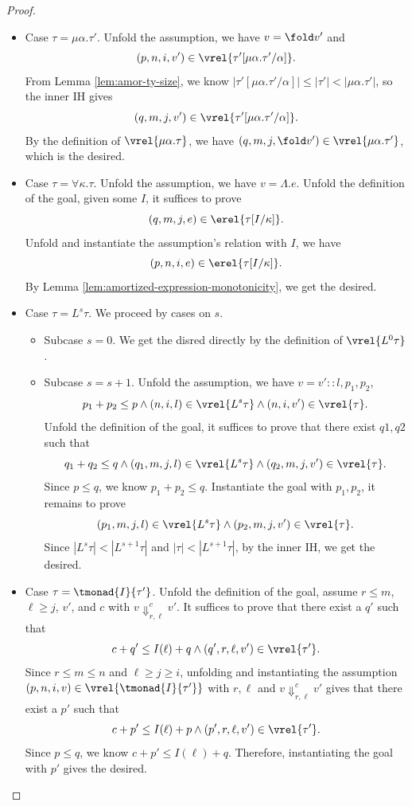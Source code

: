 \begin{proof}
\begin{itemize}
\item Case $\tau = \mu\alpha.\tau'$.
Unfold the assumption, we have $v=\fold v'$ and 
\[
  (p, n,i,v')\in
  \vrel{\tau'[\mu\alpha.\tau'/\alpha]}.
\]
From Lemma \ref{lem:amor-ty-size}, we know $|\tau'[\mu\alpha.\tau'/\alpha]|\leq |\tau'| < |\mu\alpha.\tau'|$, so the inner IH gives
\[
  (q, m,j,v')\in
  \vrel{\tau'[\mu\alpha.\tau'/\alpha]}.
\]
By the definition of $\vrel{\mu\alpha.\tau}$, we have 
$(q, m,j,\fold v')\in\vrel{\mu\alpha.\tau'}$, which is the desired.

\item Case $\tau = \forall\kappa.\tau$.
Unfold the assumption, we have $v = \Lambda.e$.
Unfold the definition of the goal, given some $I$, it suffices to prove
\[(q, m,j,e) \in \erel{\tau[I/\kappa]}.\]
Unfold and instantiate the assumption's relation with $I$, we have 
\[(p, n,i,e) \in \erel{\tau[I/\kappa]}.\]
By Lemma \ref{lem:amortized-expression-monotonicity}, we get the desired.

\item Case $\tau = L^s \tau$.
We proceed by cases on $s$.

\begin{itemize}
\item {Subcase $s=0$.} We get the disred directly by the definition of $\vrel{L^0\tau}$.

\item {Subcase $s=s+1$.} Unfold the assumption, we have $v=v'::l, p_1, p_2$, 
\[
  p_1 + p_2 \leq p \land
  (n, i, l) \in \vrel{L^s\tau} \land
  (n, i, v') \in \vrel{\tau}.
\]
Unfold the definition of the goal, it suffices to prove that there exist $q1, q2$ such that
\[
  q_1 + q_2 \leq q \land
  (q_1,m, j, l) \in \vrel{L^s\tau} \land
  (q_2,m, j, v') \in \vrel{\tau}.
\]
Since $p \leq q$, we know $p_1 + p_2 \leq q$. Instantiate the goal with $p_1, p_2$, it remains to prove
\[ (p_1,m, j, l) \in \vrel{L^s\tau} \land
  (p_2,m, j, v') \in \vrel{\tau}.\]
Since $|L^s\tau| < |L^{s+1}\tau|$ and $|\tau| < |L^{s+1}\tau|$,
by the inner IH, we get the desired.
\end{itemize}

\item Case $\tau = \tmonad{I}{\tau'}$.
Unfold the definition of the goal, assume $r \leq m$, $\ell \geq j$, $v'$, and $c$
with $v\Downarrow^c_{r,\ell}v'$. It suffices to prove that there exist a $q'$ such that
\[c+q' \leq I(\ell)+q \land (q',r, \ell, v') \in \vrel{\tau'}.\]
Since $r\leq m\leq n$ and $\ell\geq j\geq i$, unfolding and instantiating the assumption $(p, n, i, v) \in 
\vrel{\tmonad{ I}{\tau'}}$ with $r, \ell$ and $v\Downarrow^c_{r,\ell}v'$ gives that there exist a $p'$ such that
\[c+p' \leq I(\ell)+p \land (p',r, \ell, v') \in \vrel{\tau'}.\]
Since $p \leq q$, we know $c+p' \leq I(\ell) + q$. Therefore, instantiating the goal with $p'$ gives the desired.
\end{itemize}
\end{proof}


